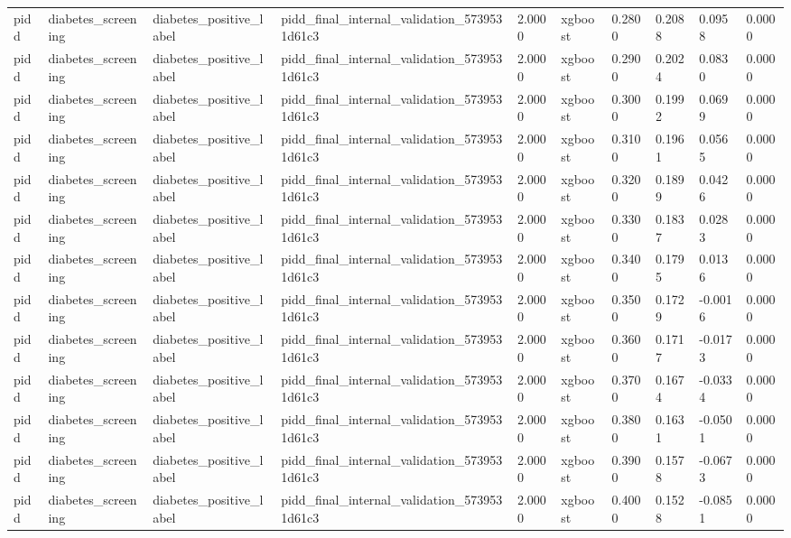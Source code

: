 \begin{tabular}{llllllllll}
pidd & diabetes\_screening & diabetes\_positive\_label & pidd\_final\_internal\_validation\_5739531d61c3 & 2.0000 & xgboost & 0.2800 & 0.2088 & 0.0958 & 0.0000 \\
pidd & diabetes\_screening & diabetes\_positive\_label & pidd\_final\_internal\_validation\_5739531d61c3 & 2.0000 & xgboost & 0.2900 & 0.2024 & 0.0830 & 0.0000 \\
pidd & diabetes\_screening & diabetes\_positive\_label & pidd\_final\_internal\_validation\_5739531d61c3 & 2.0000 & xgboost & 0.3000 & 0.1992 & 0.0699 & 0.0000 \\
pidd & diabetes\_screening & diabetes\_positive\_label & pidd\_final\_internal\_validation\_5739531d61c3 & 2.0000 & xgboost & 0.3100 & 0.1961 & 0.0565 & 0.0000 \\
pidd & diabetes\_screening & diabetes\_positive\_label & pidd\_final\_internal\_validation\_5739531d61c3 & 2.0000 & xgboost & 0.3200 & 0.1899 & 0.0426 & 0.0000 \\
pidd & diabetes\_screening & diabetes\_positive\_label & pidd\_final\_internal\_validation\_5739531d61c3 & 2.0000 & xgboost & 0.3300 & 0.1837 & 0.0283 & 0.0000 \\
pidd & diabetes\_screening & diabetes\_positive\_label & pidd\_final\_internal\_validation\_5739531d61c3 & 2.0000 & xgboost & 0.3400 & 0.1795 & 0.0136 & 0.0000 \\
pidd & diabetes\_screening & diabetes\_positive\_label & pidd\_final\_internal\_validation\_5739531d61c3 & 2.0000 & xgboost & 0.3500 & 0.1729 & -0.0016 & 0.0000 \\
pidd & diabetes\_screening & diabetes\_positive\_label & pidd\_final\_internal\_validation\_5739531d61c3 & 2.0000 & xgboost & 0.3600 & 0.1717 & -0.0173 & 0.0000 \\
pidd & diabetes\_screening & diabetes\_positive\_label & pidd\_final\_internal\_validation\_5739531d61c3 & 2.0000 & xgboost & 0.3700 & 0.1674 & -0.0334 & 0.0000 \\
pidd & diabetes\_screening & diabetes\_positive\_label & pidd\_final\_internal\_validation\_5739531d61c3 & 2.0000 & xgboost & 0.3800 & 0.1631 & -0.0501 & 0.0000 \\
pidd & diabetes\_screening & diabetes\_positive\_label & pidd\_final\_internal\_validation\_5739531d61c3 & 2.0000 & xgboost & 0.3900 & 0.1578 & -0.0673 & 0.0000 \\
pidd & diabetes\_screening & diabetes\_positive\_label & pidd\_final\_internal\_validation\_5739531d61c3 & 2.0000 & xgboost & 0.4000 & 0.1528 & -0.0851 & 0.0000 \\

\end{tabular}
